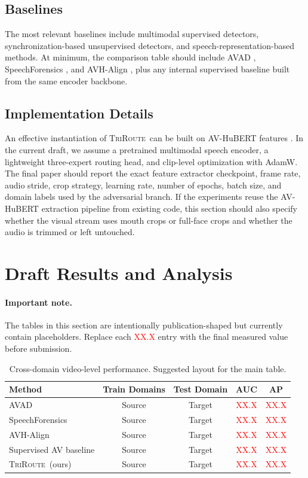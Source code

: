 \documentclass{article}
\newcommand{\method}{\textsc{TriRoute}}
\newcommand{\xx}{\textcolor{red}{XX.X}}
\begin{document}
\subsection{Baselines}

The most relevant baselines include multimodal supervised detectors, synchronization-based unsupervised detectors, and speech-representation-based methods. At minimum, the comparison table should include AVAD \citep{feng2023avad}, SpeechForensics \citep{liang2024speechforensics}, and AVH-Align \citep{smeu2025avhalign}, plus any internal supervised baseline built from the same encoder backbone.

\subsection{Implementation Details}

An effective instantiation of \method\ can be built on AV-HuBERT features \citep{shi2022avhubert}. In the current draft, we assume a pretrained multimodal speech encoder, a lightweight three-expert routing head, and clip-level optimization with AdamW. The final paper should report the exact feature extractor checkpoint, frame rate, audio stride, crop strategy, learning rate, number of epochs, batch size, and domain labels used by the adversarial branch. If the experiments reuse the AV-HuBERT extraction pipeline from existing code, this section should also specify whether the visual stream uses mouth crops or full-face crops and whether the audio is trimmed or left untouched.

\section{Draft Results and Analysis}

\paragraph{Important note.}
The tables in this section are intentionally publication-shaped but currently contain placeholders. Replace each \xx{} entry with the final measured value before submission.

\begin{table}[t]
    \centering
    \caption{Cross-domain video-level performance. Suggested layout for the main table.}
    \label{tab:main}
    \small
    \begin{tabular}{lcccc}
        \toprule
        Method & Train Domains & Test Domain & AUC & AP \\
        \midrule
        AVAD \citep{feng2023avad} & Source & Target & \xx & \xx \\
        SpeechForensics \citep{liang2024speechforensics} & Source & Target & \xx & \xx \\
        AVH-Align \citep{smeu2025avhalign} & Source & Target & \xx & \xx \\
        Supervised AV baseline & Source & Target & \xx & \xx \\
        \method\ (ours) & Source & Target & \xx & \xx \\
        \bottomrule
    \end{tabular}
\end{table}
\end{document}
